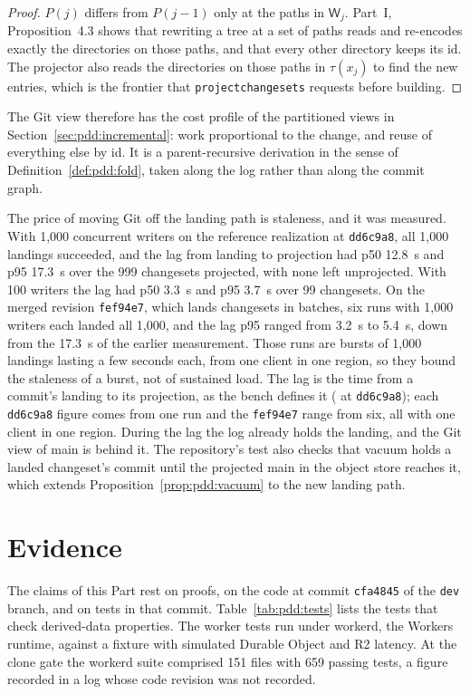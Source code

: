 \documentclass[11pt,letterpaper]{article}
\theoremstyle{definition}
\theoremstyle{remark}
\newcommand{\tree}{\tau}
\newcommand{\W}{\mathsf{W}}
\DeclareRobustCommand{\code}[1]{{\def\_{\textunderscore\allowbreak}\texttt{#1}}}
\begin{document}
\begin{proof}
$P(j)$ differs from $P(j-1)$ only at the paths in $\W_j$. Part~I, Proposition~4.3 shows that rewriting a tree at a set of paths reads and re-encodes exactly the directories on those paths, and that every other directory keeps its id. The projector also reads the directories on those paths in $\tree(x_j)$ to find the new entries, which is the frontier that \code{project\_changesets} requests before building.
\end{proof}

The Git view therefore has the cost profile of the partitioned views in Section~\ref{sec:pdd:incremental}: work proportional to the change, and reuse of everything else by id. It is a parent-recursive derivation in the sense of Definition~\ref{def:pdd:fold}, taken along the log rather than along the commit graph.

The price of moving Git off the landing path is staleness, and it was measured. With 1,000 concurrent writers on the reference realization at \code{dd6c9a8}, all 1,000 landings succeeded, and the lag from landing to projection had p50 12.8~s and p95 17.3~s over the 999 changesets projected, with none left unprojected. %
With 100 writers the lag had p50 3.3~s and p95 3.7~s over 99 changesets. %
On the merged revision \code{fef94e7}, which lands changesets in batches, six runs with 1,000 writers each landed all 1,000, and the lag p95 ranged from 3.2~s to 5.4~s, down from the 17.3~s of the earlier measurement. %
Those runs are bursts of 1,000 landings lasting a few seconds each, from one client in one region, so they bound the staleness of a burst, not of sustained load.
The lag is the time from a commit's landing to its projection, as the bench defines it ( at \code{dd6c9a8}); each \code{dd6c9a8} figure comes from one run and the \code{fef94e7} range from six, all with one client in one region. During the lag the log already holds the landing, and the Git view of main is behind it. The repository's test also checks that vacuum holds a landed changeset's commit until the projected main in the object store reaches it, which extends Proposition~\ref{prop:pdd:vacuum} to the new landing path.

\section{Evidence}
\label{sec:pdd:evidence}

The claims of this Part rest on proofs, on the code at commit \code{cfa4845} of the \code{dev} branch, and on tests in that commit. Table~\ref{tab:pdd:tests} lists the tests that check derived-data properties. The worker tests run under workerd, the Workers runtime, against a fixture with simulated Durable Object and R2 latency. At the clone gate the workerd suite comprised 151 files with 659 passing tests, %
a figure recorded in a log whose code revision was not recorded.
\end{document}
